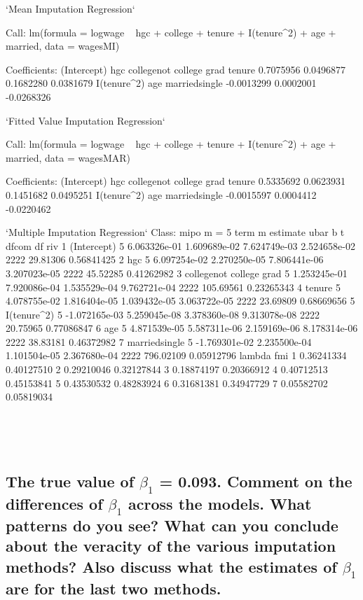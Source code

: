 \documentclass{article}
\begin{document}
`Mean Imputation Regression`

Call:
lm(formula = logwage ~ hgc + college + tenure + I(tenure^2) + 
    age + married, data = wagesMI)

Coefficients:
            (Intercept)                      hgc  collegenot college grad                   tenure  
              0.7075956                0.0496877                0.1682280                0.0381679  
            I(tenure^2)                      age            marriedsingle  
             -0.0013299                0.0002001               -0.0268326  


`Fitted Value Imputation Regression`

Call:
lm(formula = logwage ~ hgc + college + tenure + I(tenure^2) + 
    age + married, data = wagesMAR)

Coefficients:
            (Intercept)                      hgc  collegenot college grad                   tenure  
              0.5335692                0.0623931                0.1451682                0.0495251  
            I(tenure^2)                      age            marriedsingle  
             -0.0015597                0.0004412               -0.0220462  


`Multiple Imputation Regression`
Class: mipo    m = 5 
                     term m      estimate         ubar            b            t dfcom        df        riv
1             (Intercept) 5  6.063326e-01 1.609689e-02 7.624749e-03 2.524658e-02  2222  29.81306 0.56841425
2                     hgc 5  6.097254e-02 2.270250e-05 7.806441e-06 3.207023e-05  2222  45.52285 0.41262982
3 collegenot college grad 5  1.253245e-01 7.920086e-04 1.535529e-04 9.762721e-04  2222 105.69561 0.23265343
4                  tenure 5  4.078755e-02 1.816404e-05 1.039432e-05 3.063722e-05  2222  23.69809 0.68669656
5             I(tenure^2) 5 -1.072165e-03 5.259045e-08 3.378360e-08 9.313078e-08  2222  20.75965 0.77086847
6                     age 5  4.871539e-05 5.587311e-06 2.159169e-06 8.178314e-06  2222  38.83181 0.46372982
7           marriedsingle 5 -1.769301e-02 2.235500e-04 1.101504e-05 2.367680e-04  2222 796.02109 0.05912796
      lambda        fmi
1 0.36241334 0.40127510
2 0.29210046 0.32127844
3 0.18874197 0.20366912
4 0.40712513 0.45153841
5 0.43530532 0.48283924
6 0.31681381 0.34947729
7 0.05582702 0.05819034

\

\

\subsection{The true value of $\beta_1$ = 0.093. Comment on the differences of $\beta_1$ across the models.
What patterns do you see? What can you conclude about the veracity of the various imputation methods? Also discuss what the estimates of $\beta_1$ are for the last two
methods.}
\end{document}
